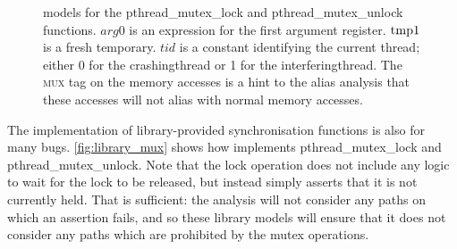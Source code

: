 \begin{figure}
  \centerline{
    {\hfill}
    {\hfill}
  }
  \vspace{-12pt}
  \caption{{\StateMachine} models for the pthread\_mutex\_lock and
    pthread\_mutex\_unlock functions.  $\mathit{arg0}$ is an
    expression for the first argument register.  $\mathrm{tmp1}$ is a
    fresh {\StateMachine} temporary.  $\mathit{tid}$ is a constant
    identifying the current thread; either 0 for the
    \gls{crashingthread} or 1 for the \gls{interferingthread}.  The
    \textsc{mux} tag on the memory accesses is a hint to the alias
    analysis that these accesses will not alias with normal memory
    accesses.}
  \label{fig:library_mux}
\end{figure}

The implementation of library-provided synchronisation functions is
also for many bugs.  \autoref{fig:library_mux} shows how {\technique}
implements pthread\_mutex\_lock and pthread\_mutex\_unlock.  Note that
the lock operation does not include any logic to wait for the lock to
be released, but instead simply asserts that it is not currently held.
That is sufficient: the analysis will not consider any paths on which
an assertion fails, and so these library models will ensure that it
does not consider any paths which are prohibited by the mutex
operations.

